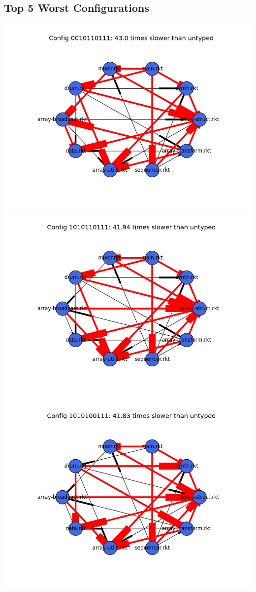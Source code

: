 \documentclass{article}
\begin{document}
\begin{itemize}
\subsection{Top 5 Worst Configurations}
\includegraphics[width=\textwidth]{funkytown-module-graph-0010110111.png}
\includegraphics[width=\textwidth]{funkytown-module-graph-1010110111.png}
\includegraphics[width=\textwidth]{funkytown-module-graph-1010100111.png}

\end{itemize}
\end{document}
